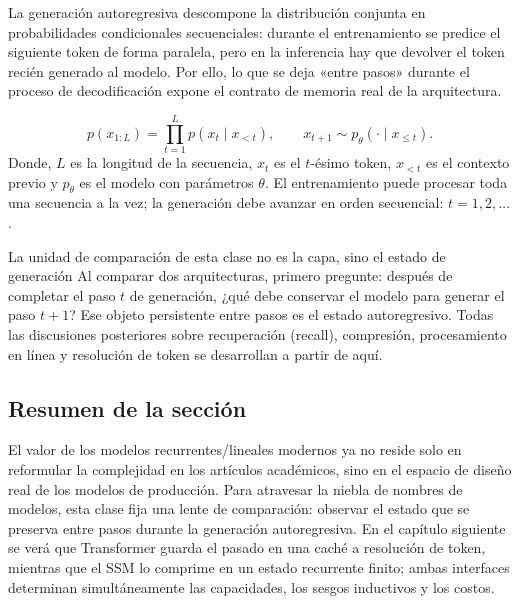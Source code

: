 La generación autoregresiva descompone la distribución conjunta en probabilidades condicionales secuenciales: durante el entrenamiento se predice el siguiente token de forma paralela, pero en la inferencia hay que devolver el token recién generado al modelo. Por ello, lo que se deja «entre pasos» durante el proceso de decodificación expone el contrato de memoria real de la arquitectura.

\[
p(x_{1:L})=\prod_{t=1}^{L}p(x_t\mid x_{<t}),
\qquad
x_{t+1}\sim p_\theta(\cdot\mid x_{\le t}).
\]
Donde, $L$ es la longitud de la secuencia, $x_t$ es el $t$-ésimo token, $x_{<t}$ es el contexto previo y $p_\theta$ es el modelo con parámetros $\theta$. El entrenamiento puede procesar toda una secuencia a la vez; la generación debe avanzar en orden secuencial: $t=1,2,\ldots$.



\begin{importantbox}{La unidad de comparación de esta clase no es la capa, sino el estado de generación}
Al comparar dos arquitecturas, primero pregunte: después de completar el paso $t$ de generación, ¿qué debe conservar el modelo para generar el paso $t+1$? Ese objeto persistente entre pasos es el estado autoregresivo. Todas las discusiones posteriores sobre recuperación (recall), compresión, procesamiento en línea y resolución de token se desarrollan a partir de aquí.
\end{importantbox}

\subsection{Resumen de la sección}

El valor de los modelos recurrentes/lineales modernos ya no reside solo en reformular la complejidad en los artículos académicos, sino en el espacio de diseño real de los modelos de producción. Para atravesar la niebla de nombres de modelos, esta clase fija una lente de comparación: observar el estado que se preserva entre pasos durante la generación autoregresiva. En el capítulo siguiente se verá que Transformer guarda el pasado en una caché a resolución de token, mientras que el SSM lo comprime en un estado recurrente finito; ambas interfaces determinan simultáneamente las capacidades, los sesgos inductivos y los costos.
